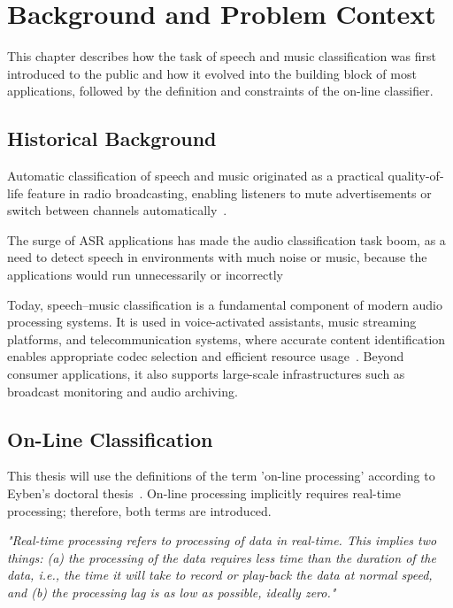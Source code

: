 \chapter{Background and Problem Context}
\label{cap:background}
This chapter describes how the task of speech and music classification was first introduced to the public and how it evolved into the building block of most applications, followed by the definition and constraints of the on-line classifier.

\section{Historical Background}
Automatic classification of speech and music originated as a practical quality-of-life feature in radio broadcasting, enabling listeners to mute advertisements or switch between channels automatically~\cite {543290}.

The surge of ASR applications has made the audio classification task boom, as a need to detect speech in environments with much noise or music, because the applications would run unnecessarily or incorrectly~\cite {596192}

Today, speech–music classification is a fundamental component of modern audio processing systems.
It is used in voice-activated assistants, music streaming platforms, and telecommunication systems, where accurate content identification enables appropriate codec selection and efficient resource usage~\cite{ren2024fewertokenneuralspeechcodec, jia2025practicalrealtimeneuralvideo}.
Beyond consumer applications, it also supports large-scale infrastructures such as broadcast monitoring and audio archiving.

\section{On-Line Classification}
\label{sec:on-line_classification}
This thesis will use the definitions of the term 'on-line processing' according to Eyben's doctoral thesis~\cite{Eyben2016}.
On-line processing implicitly requires real-time processing; therefore, both terms are introduced.

\textit{"Real-time processing refers to processing of data in real-time. This implies two things: (a) the processing of the data requires less time than the duration of the data, i.e., the time it will take to record or play-back the data at normal speed, and (b) the processing lag is as low as possible, ideally zero."}

